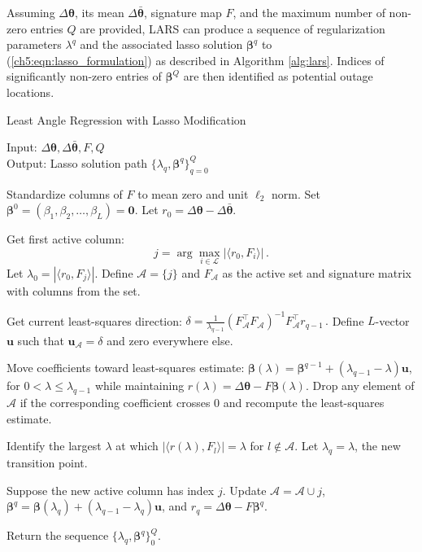 Assuming $\Delta\boldsymbol{\theta}$, its mean $\Delta\bar{\boldsymbol{\theta}}$, signature map $F$, and the maximum number of non-zero entries $Q$ are provided, LARS can produce a sequence of regularization parameters $\lambda^q$ and the associated lasso solution $\boldsymbol{\beta}^q$ to (\ref{ch5:eqn:lasso_formulation}) as described in Algorithm \ref{alg:lars}. Indices of significantly non-zero entries of $\boldsymbol{\beta}^Q$ are then identified as potential outage locations. 
\begin{algorithm}
\caption{Least Angle Regression with Lasso Modification}
\label{alg:lars}
Input: $\Delta\boldsymbol{\theta}, \Delta\boldsymbol{\bar{\theta}}, F, Q$\\
Output: Lasso solution path $\{\lambda_q, \boldsymbol{\beta}^q\}_{q=0}^{Q}$
\begin{algorithmic}[1]
\State Standardize columns of $F$ to mean zero and unit $\ell_2$ norm. 
Set $\boldsymbol{\beta}^0 = (\beta_1, \beta_2, \dots, \beta_L) = \mathbf{0}$. Let $r_0 = \Delta\boldsymbol{\theta} - \Delta\boldsymbol{\bar{\theta}}$. 

\State Get first active column: 
$$
j = \arg\underset{i \in \mathcal{L}}\max|\langle r_0, F_i\rangle | \,.
$$
Let $\lambda_0 = |\langle r_0, F_j\rangle |$. Define $\mathcal{A} = \{j\}$ and $F_{\mathcal{A}}$ as the active set and signature matrix with columns from the set. 

\State Get current least-squares direction: 
$
\delta = \frac{1}{\lambda_{q - 1}}(F_{\mathcal{A}}^{\top}F_{\mathcal{A}})^{-1}F_{\mathcal{A}}^{\top}r_{q-1} \,.
$ 
Define $L$-vector $\mathbf{u}$ such that $\mathbf{u}_{\mathcal{A}} = \delta$ and zero everywhere else.

\State  Move coefficients toward least-squares estimate: $\boldsymbol{\beta}(\lambda) = \boldsymbol{\beta}^{q-1} + (\lambda_{q-1} - \lambda) \mathbf{u}$, for $0 < \lambda \le \lambda_{q-1}$ while maintaining $r(\lambda) = \Delta\boldsymbol{\theta} - F \boldsymbol{\beta}(\lambda)$. Drop any element of $\mathcal{A}$ if the corresponding coefficient crosses 0 and recompute the least-squares estimate. 

\State Identify the largest $\lambda$ at which $|\langle r(\lambda), F_l \rangle| = \lambda$ for $l \notin \mathcal{A}$. Let $\lambda_q = \lambda$, the new transition point.

\State Suppose the new active column has index $j$. Update $\mathcal{A} = \mathcal{A} \cup j$, $\boldsymbol{\beta}^q = \boldsymbol{\beta}(\lambda_q) + (\lambda_{q-1} - \lambda_q)\mathbf{u}$, and $r_q = \Delta\boldsymbol{\theta} - F \boldsymbol{\beta}^q$.
\EndFor

\State Return the sequence $\{\lambda_q, \boldsymbol{\beta}^q \}_0^Q$.
\end{algorithmic}
\end{algorithm}
